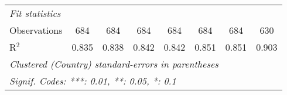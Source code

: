 \begin{tabular}{lccccccc}
   \midrule \emph{Fit statistics}\\
   Observations                                                          & 684            & 684            & 684            & 684            & 684            & 684            & 630\\  
   R$^2$                                                                 & 0.835          & 0.838          & 0.842          & 0.842          & 0.851          & 0.851          & 0.903\\  
   \midrule
   \multicolumn{8}{l}{\emph{Clustered (Country) standard-errors in parentheses}}\\
   \multicolumn{8}{l}{\emph{Signif. Codes: ***: 0.01, **: 0.05, *: 0.1}}\\
\end{tabular}
\par\endgroup


